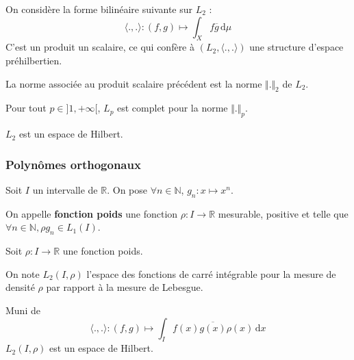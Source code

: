 	\begin{definition}
		On considère la forme bilinéaire suivante sur $L_2$ :
		\[ \langle ., . \rangle : (f, g) \mapsto \int_X f \overline{g} \, \mathrm{d}\mu \]
		C'est un produit un scalaire, ce qui confère à $(L_2, \langle ., . \rangle)$ une structure d'espace préhilbertien.
	\end{definition}
	
	\begin{remark}
		La norme associée au produit scalaire précédent est la norme $\Vert . \Vert_2$ de $L_2$.
	\end{remark}
	
	
	\begin{theorem}
		Pour tout $p \in ]1, +\infty[$, $L_p$ est complet pour la norme $\Vert . \Vert_p$.
	\end{theorem}
	
	
	\begin{corollary}
		$L_2$ est un espace de Hilbert.
	\end{corollary}
	
	\subsubsection{Polynômes orthogonaux}
	
	
	Soit $I$ un intervalle de $\mathbb{R}$. On pose $\forall n \in \mathbb{N}$, $g_n : x \mapsto x^n$.
	
	\begin{definition}
		On appelle \textbf{fonction poids} une fonction $\rho : I \rightarrow \mathbb{R}$ mesurable, positive et telle que $\forall n \in \mathbb{N}, \rho g_n \in L_1(I)$.
	\end{definition}
	
	Soit $\rho : I \rightarrow \mathbb{R}$ une fonction poids.
	
	\begin{notation}
		On note $L_2(I, \rho)$ l'espace des fonctions de carré intégrable pour la mesure de densité $\rho$ par rapport à la mesure de Lebesgue.
	\end{notation}
	
	\begin{proposition}
		Muni de
		\[ \langle ., . \rangle : (f,g) \mapsto \int_I f(x) \overline{g(x)} \rho(x) \, \mathrm{d}x \]
		$L_2(I, \rho)$ est un espace de Hilbert.
	\end{proposition}
	

